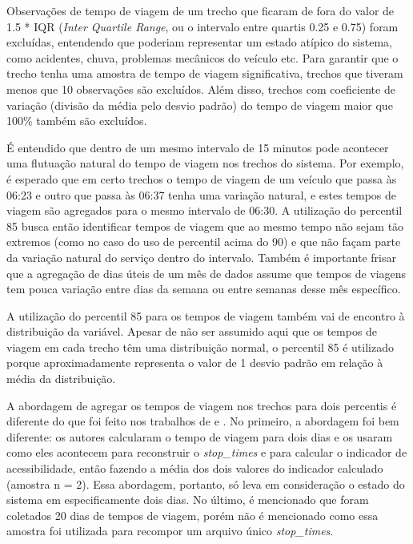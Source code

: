 \documentclass[        
    a4paper,          %
    12pt,             %
    chapter=TITLE,    %
    section=Title,    %
    subsection=Title, %
    oneside,          %
    english,          %
    spanish,          %
    brazil,           %
    fleqn             %
]{abntex2}
\begin{document}
  Observações de tempo de viagem de um trecho que ficaram de fora do valor de 1.5 * IQR (\emph{Inter Quartile Range}, ou o intervalo entre quartis 0.25 e 0.75) foram excluídas, entendendo que poderiam representar um estado atípico do sistema, como acidentes, chuva, problemas mecânicos do veículo etc. Para garantir que o trecho tenha uma amostra de tempo de viagem significativa, trechos que tiveram menos que 10 observações são excluídos. Além disso, trechos com coeficiente de variação (divisão da média pelo desvio padrão) do tempo de viagem maior que 100\% também são excluídos.
  
  É entendido que dentro de um mesmo intervalo de 15 minutos pode acontecer uma flutuação natural do tempo de viagem nos trechos do sistema. Por exemplo, é esperado que em certo trechos o tempo de viagem de um veículo que passa às 06:23 e outro que passa às 06:37 tenha uma variação natural, e estes tempos de viagem são agregados para o mesmo intervalo de 06:30. A utilização do percentil 85 busca então identificar tempos de viagem que ao mesmo tempo não sejam tão extremos (como no caso do uso de percentil acima do 90) e que não façam parte da variação natural do serviço dentro do intervalo. Também é importante frisar que a agregação de dias úteis de um mês de dados assume que tempos de viagens tem pouca variação entre dias da semana ou entre semanas desse mês específico.
  
  A utilização do percentil 85 para os tempos de viagem também vai de encontro à distribuição da variável. Apesar de não ser assumido aqui que os tempos de viagem em cada trecho têm uma distribuição normal, o percentil 85 é utilizado porque aproximadamente representa o valor de 1 desvio padrão em relação à média da distribuição.
  
  A abordagem de agregar os tempos de viagem nos trechos para dois percentis é diferente do que foi feito nos trabalhos de \citet{Wessel2017} e \citet{Arbex2016a}. No primeiro, a abordagem foi bem diferente: os autores calcularam o tempo de viagem para dois dias e os usaram como eles acontecem para reconstruir o \emph{stop\_times} e para calcular o indicador de acessibilidade, então fazendo a média dos dois valores do indicador calculado (amostra n = 2). Essa abordagem, portanto, só leva em consideração o estado do sistema em especificamente dois dias. No último, é mencionado que foram coletados 20 dias de tempos de viagem, porém não é mencionado como essa amostra foi utilizada para recompor um arquivo único \emph{stop\_times}.
  
\end{document}
